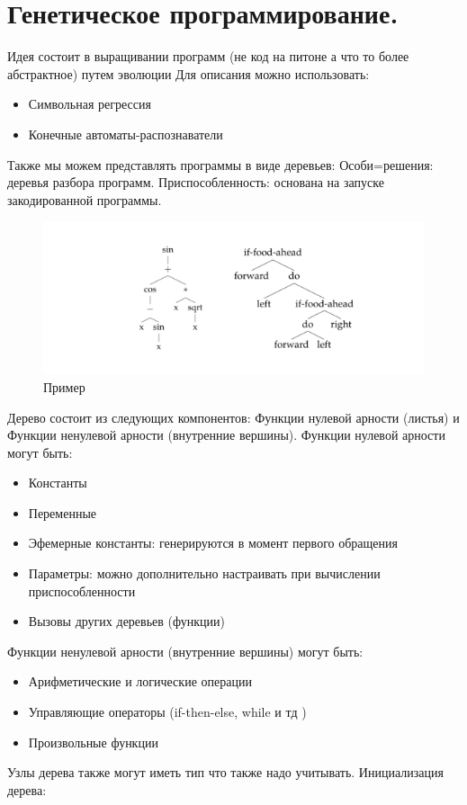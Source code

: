 \section{Генетическое программирование.}
Идея состоит в выращивании программ (не код на питоне а что то более абстрактное) путем эволюции
Для описания можно использовать:
\begin{itemize}
\item Символьная регрессия
\item Конечные автоматы-распознаватели
\end{itemize}
Также мы можем представлять программы в виде деревьев:
Особи=решения: деревья разбора программ. Приспособленность: основана на запуске закодированной программы. 
 \begin{figure}[h]
\centering
\includegraphics[width=0.8\linewidth]{images/evolv_gen.png}
\caption{Пример}
\label{fig:mpr}
\end{figure}
Дерево состоит из следующих компонентов: Функции нулевой арности (листья) и Функции ненулевой арности (внутренние вершины).
Функции нулевой арности могут быть:
\begin{itemize}
	\item Константы
	\item Переменные
	\item Эфемерные константы: генерируются в момент первого обращения
	\item Параметры: можно дополнительно настраивать при вычислении приспособленности
	\item Вызовы других деревьев (функции)
\end{itemize}
Функции ненулевой арности (внутренние вершины) могут быть:
\begin{itemize}
	\item Арифметические и логические операции
	\item Управляющие операторы (if-then-else, while и тд )
	\item Произвольные функции
\end{itemize}
Узлы дерева также могут иметь тип что также надо учитывать. 
Инициализация дерева:
